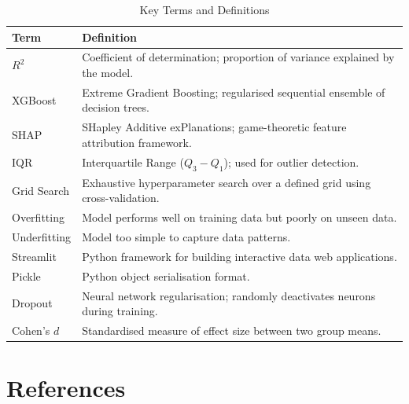 \documentclass[12pt,a4paper]{report}
\begin{document}
\begin{table}[H]
\centering
\caption{Key Terms and Definitions}
\begin{tabular}{p{3cm}p{10.5cm}}
\toprule
\textbf{Term} & \textbf{Definition} \\
\midrule
$R^2$        & Coefficient of determination; proportion of variance explained by the model. \\
XGBoost      & Extreme Gradient Boosting; regularised sequential ensemble of decision trees. \\
SHAP         & SHapley Additive exPlanations; game-theoretic feature attribution framework. \\
IQR          & Interquartile Range ($Q_3 - Q_1$); used for outlier detection. \\
Grid Search  & Exhaustive hyperparameter search over a defined grid using cross-validation. \\
Overfitting  & Model performs well on training data but poorly on unseen data. \\
Underfitting & Model too simple to capture data patterns. \\
Streamlit    & Python framework for building interactive data web applications. \\
Pickle       & Python object serialisation format. \\
Dropout      & Neural network regularisation; randomly deactivates neurons during training. \\
Cohen's $d$  & Standardised measure of effect size between two group means. \\
\bottomrule
\end{tabular}
\end{table}

\chapter*{References}
\end{document}
